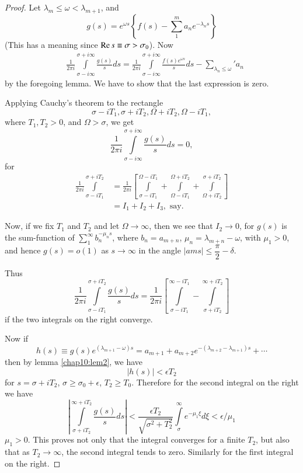 \begin{proof}
Let $\lambda_m \leq \omega < \lambda_{m+1}$, and
$$
g(s) = e^{\omega s} \left\{f(s) - \sum\limits^m_1 a_n e^{-\lambda_n s}
\right\} 
$$
(This has a meaning since $\operatorname{Re} s \equiv \sigma > \sigma_0$). Now 
\begin{align*}
& \frac{1}{2\pi i} \int\limits^{\sigma + i \infty}_{\sigma - i \infty}
\frac{g(s)}{s} ds
 = \frac{1}{2\pi i} \int\limits^{\sigma + i \infty}_{\sigma -
i \infty} \frac{f(s) e^{\omega s}}{s} ds - {\mathop{\sum\limits}_{\lambda_n \leq
  \omega}}' a_n
\end{align*}
by the foregoing lemma. We have to show that the last expression is
zero. 

Applying Cauchy's theorem to the rectangle
$$
\sigma-i T_1, \sigma + i T_2, \Omega + i T_2, \Omega -i T_1,
$$
where $T_1 ,T_2 >0$, and $\Omega>\sigma$, we get
$$
\frac{1}{2\pi i} \int\limits^{\sigma + i \infty}_{\sigma - i \infty}
\frac{g(s)}{s} ds = 0,
$$
for\pageoriginale
\begin{align*}
\frac{1}{2\pi i} \int\limits^{\sigma + i T_2}_{\sigma - i T_1} & =
\frac{1}{2\pi i} \left[ \int\limits^{\Omega - i T_1}_{\sigma - i T_1}
  + \int\limits^{\Omega + i T_2}_{\Omega - i T_1} +
  \int\limits^{\sigma + i T_2}_{\Omega + i T_2} \right]\\
& = I_1 + I_2 + I_3, \text{ say}.
\end{align*}

Now, if we fix $T_1$ and $T_2$ and let $\Omega \to \infty$, then we
see that $I_2 \to 0$, for $g(s)$ is the sum-function of
$\sum\limits^\infty_1 b_n^{-\mu_n s}$, where $b_n = a_{m+n}$, $\mu_n =
\lambda_{m+n} - \omega$, with $\mu_1 > 0$, and hence $g(s) = o(1)$ as
$s \to \infty$ in the angle $|am s| \leq \dfrac{\pi}{2} - \delta$.

Thus
$$
\frac{1}{2\pi i} \int\limits^{\sigma + i T_2}_{\sigma - i T_1}
\frac{g(s)}{s} ds = \frac{1}{2\pi i} \left[\int\limits^{\infty - i
    T_1}_{\sigma - i T_1} - \int\limits^{\infty + i T_2}_{\sigma + i
    T_2} \right] 
$$
if the two integrals on the right converge. 

Now if 
$$
h(s) \equiv g(s) e^{(\lambda_{m+1}-\omega)s} = a_{m+1} + a_{m+2}
e^{-(\lambda_{m+2} - \lambda_{m+1})s} + \cdots
$$
then by lemma \ref{chap10:lem2}, we have
$$
|h(s)| < \epsilon T_2
$$
for $s = \sigma + i T_2 $, $\sigma \geq \sigma_0 + \epsilon$,
$T_2 \geq T_0$. Therefore for the second integral on the\pageoriginale
right we have
$$
\left|\int\limits^{\infty + i T_2}_{\sigma + i T_2} \frac{g(s)}{s} ds
\right|  < \frac{\epsilon T_2}{\sqrt{\sigma^2 + T^2_2}}
\int\limits^\infty_\sigma e^{-\mu_1 \xi} d\xi < \epsilon /\mu_1
$$
$\mu_1 > 0$. This proves not only that the integral converges for a
finite $T_2$, but also that as $T_2 \to \infty$, the second integral
tends to zero. Similarly for the first integral on the right.
\end{proof}

